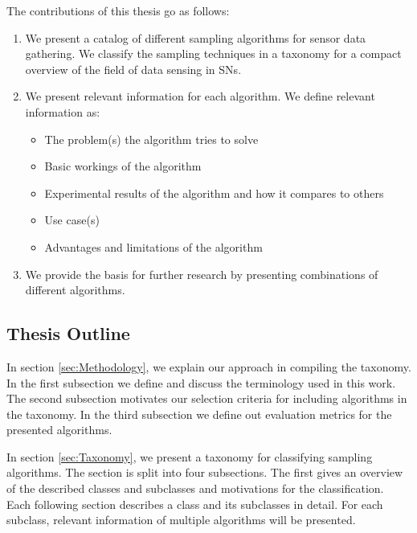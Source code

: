 The contributions of this thesis go as follows: 
\begin{enumerate}
    \item We present a catalog of different sampling algorithms for sensor data
    gathering. We classify the sampling techniques in a taxonomy for a compact
    overview of the field of data sensing in \acp{SN}.
    \item We present relevant information for each algorithm. We define
    relevant information as:

        \begin{itemize}
            \item The problem(s) the algorithm tries to solve
            \item Basic workings of the algorithm
            \item Experimental results of the algorithm and how it compares to others
            \item Use case(s)
            \item Advantages and limitations of the algorithm
        \end{itemize}

    \item We provide the basis for further research by presenting combinations
    of different algorithms.
\end{enumerate}


\subsection{Thesis Outline}

  In section \ref{sec:Methodology}, we
explain our approach in compiling the taxonomy. In the first subsection we
define and discuss the terminology used in this work. The second subsection
motivates our selection criteria for including algorithms in the taxonomy. In
the third subsection we define out evaluation metrics for the presented
algorithms.

  In section \ref{sec:Taxonomy}, we present a
taxonomy for classifying sampling algorithms. The section is split into four
subsections. The first gives an overview of the described classes and
subclasses and motivations for the classification. Each following section
describes a class and its subclasses in detail. For each subclass, relevant
information of multiple algorithms will be presented. 

